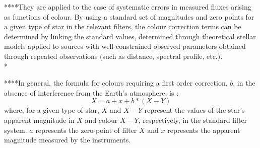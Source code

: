 
****They are applied to the case of systematic errors in measured fluxes arising as functions of colour. By using a standard set of magnitudes and zero points for a given type of star in the relevant filters, the colour correction terms can be determined by linking the standard values, determined through theoretical stellar models applied to sources with well-constrained observed parameters obtained through repeated observations (such as distance, spectral profile, etc.).\\*


****In general, the formula for colours requiring a first order correction, $b$, in the absence of interference from the Earth's atmosphere, is \citep{2000PASA...17..244S}:
\begin{equation}
 X  =  a  +  x  + b * (X-Y)
\label{color_correction_eq}
\end{equation}
where, for a given type of star, $X$ and $X-Y$ represent the values of the star's apparent magnitude in $X$ and colour $X-Y$, respectively, in the standard filter system. $a$ represents the zero-point of filter $X$ and $x$ represents the apparent magnitude measured by the instruments.
